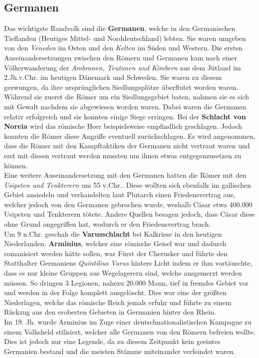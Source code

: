 \documentclass{article}
\begin{document}
	\subsection{Germanen}
	Das wichtigste Randvolk sind die \textbf{Germanen}, welche in den Germanischen Tieflanden (Heutiges Mittel- und Norddeutschland) lebten. Sie waren umgeben von den \textit{Veneden} im Osten und den \textit{Kelten} im Süden und Western. Die ersten Auseinandersetzungen zwischen den Römern und Germanen kam nach einer Völkerwanderung der \textit{Ambronen, Teutonen und Kimbern} aus dem Jütland im 2.Jh.v.Chr. im heutigen Dänemark und Schweden. Sie waren zu diesem gezwungen, da ihre ursprünglichen Siedlungsplätze überflutet worden waren. Während sie zuerst die Römer um ein Siedlungsgebiet baten, nahmen sie es sich mit Gewalt nachdem sie abgewiesen worden waren. Dabei waren die Germanen relativ erfolgreich und sie konnten einige Siege erringen. Bei der \textbf{Schlacht von Noreia} wird das römische Heer beispielsweise empfindlich geschlagen. Jedoch konnten die Römer diese Angriffe eventuell zurückschlagen. Es wird angenommen, dass die Römer mit den Kampftaktiken der Germanen nicht vertraut waren und erst mit diesen vertraut werden mussten um ihnen etwas entgegenzusetzen zu können. \\
	Eine weitere Auseinandersetzung mit den Germanen hatten die Römer mit den \textit{Usipeten und Tenkterern} um 55 v.Chr.. Diese wollten sich ebenfalls im gallischen Gebiet ansiedeln und verhandelten laut Plutarch einen Friedensvertrag aus, welcher jedoch von den Germanen gebrochen wurde, weshalb Cäsar etwa 400.000 Usipeten und Tenkterern tötete. Andere Quellen besagen jedoch, dass Cäsar diese ohne Grund angegriffen hat, wodurch er den Friedensvertrag brach. \\
	Um 9 n.Chr. geschah die \textbf{Varusschlacht} bei Kalkriese in den heutigen Niederlanden. \textbf{Arminius}, welcher eine römische Geisel war und dadurch romanisiert werden hätte sollen, war Fürst der Cherusker und führte den Statthalter Germaniens \textit{Quintilius Varus} hinters Licht indem er ihm vortäuschte, dass es nur kleine Gruppen aus Wegelagerern sind, welche ausgemerzt werden müssen. So dringen 3 Legionen, nahezu 20.000 Mann, tief in fremdes Gebiet vor und werden in der Folge komplett ausgelöscht. Dies war eine der größten Niederlagen, welche das römische Reich jemals erfuhr und führte zu einem Rückzug aus den eroberten Gebieten in Germanien hinter den Rhein. \\
	Im 19. Jh. wurde Arminius im Zuge einer deutschnationalistischen Kampagne zu einem Volksheld stilisiert, welcher alle Germanen von den Römern befreien wollte. Dies ist jedoch nur eine Legende, da zu diesem Zeitpunkt kein geeintes Germanien bestand und die meisten Stämme miteinander verfeindet waren. \\
\end{document}
